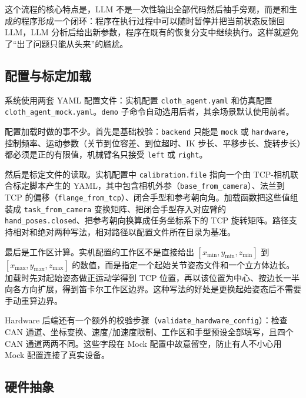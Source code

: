 这个流程的核心特点是，LLM 不是一次性输出全部代码然后袖手旁观，而是和生成的程序形成一个闭环：程序在执行过程中可以随时暂停并把当前状态反馈回 LLM，LLM 分析后给出新参数，程序在既有的恢复分支中继续执行。这样就避免了``出了问题只能从头来''的尴尬。


\subsection{配置与标定加载}
\label{subsec:agent-config}

系统使用两套 YAML 配置文件：实机配置 \texttt{cloth\_agent.yaml} 和仿真配置 \texttt{cloth\_agent\_mock.yaml}。\texttt{demo} 子命令自动选用后者，其余场景默认使用前者。

配置加载时做的事不少。首先是基础校验：\texttt{backend} 只能是 \texttt{mock} 或 \texttt{hardware}，控制频率、运动参数（关节到位容差、到位超时、IK 步长、平移步长、旋转步长）都必须是正的有限值，机械臂名只接受 \texttt{left} 或 \texttt{right}。

然后是标定文件的读取。实机配置中 \texttt{calibration.file} 指向一个由 TCP-相机联合标定脚本产生的 YAML，其中包含相机外参（\texttt{base\_from\_camera}）、法兰到 TCP 的偏移（\texttt{flange\_from\_tcp}）、闭合手型和参考朝向角。加载函数把这些值组装成 \texttt{task\_from\_camera} 变换矩阵、把闭合手型存入对应臂的 \texttt{hand\_poses.closed}、把参考朝向换算成任务坐标系下的 TCP 旋转矩阵。路径支持相对和绝对两种写法，相对路径以配置文件所在目录为基准。

最后是工作区计算。实机配置的工作区不是直接给出 $[x_{\min}, y_{\min}, z_{\min}]$ 到 $[x_{\max}, y_{\max}, z_{\max}]$ 的数值，而是指定一个起始关节姿态文件和一个立方体边长。加载时先对起始姿态做正运动学得到 TCP 位置，再以该位置为中心、按边长一半向各方向扩展，得到笛卡尔工作区边界。这种写法的好处是更换起始姿态后不需要手动重算边界。

Hardware 后端还有一个额外的校验步骤（\texttt{validate\_hardware\_config}）：检查 CAN 通道、坐标变换、速度/加速度限制、工作区和手型预设全部填写，且四个 CAN 通道两两不同。这些字段在 Mock 配置中故意留空，防止有人不小心用 Mock 配置连接了真实设备。


\subsection{硬件抽象}
\label{subsec:agent-backends}

